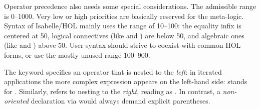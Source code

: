 \begin{isabellebody}
\begin{isamarkuptext}
  Operator precedence also needs some special considerations.  The
  admissible range is 0--1000.  Very low or high priorities are
  basically reserved for the meta-logic.  Syntax of Isabelle/HOL
  mainly uses the range of 10--100: the equality infix \isa{{\isacharequal}} is
  centered at 50, logical connectives (like \isa{{\isasymor}} and \isa{{\isasymand}}) are below 50, and algebraic ones (like \isa{{\isacharplus}} and \isa{{\isacharasterisk}}) above 50.  User syntax should strive to coexist with common
  HOL forms, or use the mostly unused range 100--900.

  \medskip The keyword  specifies an operator that
  is nested to the \emph{left}: in iterated applications the more
  complex expression appears on the left-hand side:  stands for .  Similarly,
   refers to nesting to the \emph{right}, reading
   as .  In contrast,
  a \emph{non-oriented} declaration via  would
  always demand explicit parentheses.
  

\end{isamarkuptext}
\end{isabellebody}
